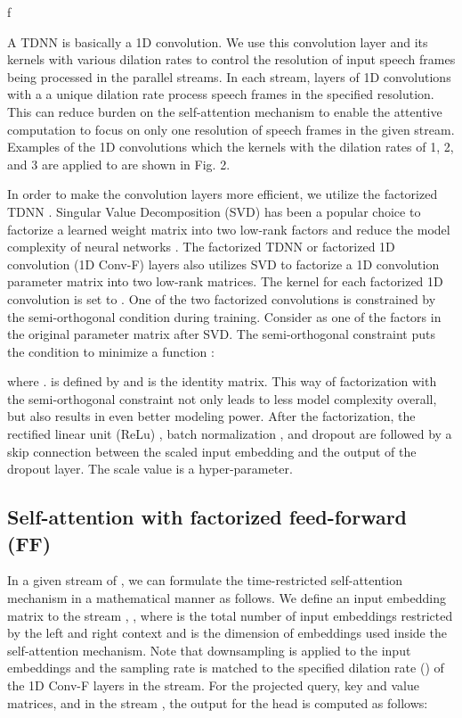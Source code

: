 f\documentclass{article}
\begin{document}
A TDNN is basically a 1D convolution. We use this convolution layer and its kernels with various dilation rates to control the resolution of input speech frames being processed in the parallel streams. In each stream, layers of 1D convolutions with a a unique dilation rate process speech frames in the specified resolution. This can reduce burden on the self-attention mechanism to enable the attentive computation to focus on only one resolution of speech frames in the given stream. Examples of the 1D convolutions which the  kernels with the dilation rates of 1, 2, and 3 are applied to are shown in Fig. 2.

In order to make the convolution layers more efficient, we utilize the factorized TDNN \cite{povey18tdnnf}. Singular Value Decomposition (SVD) has been a popular choice to factorize a learned weight matrix into two low-rank factors and reduce the model complexity of neural networks \cite{xue13,rohit16,Tucker+2016}. The factorized TDNN or factorized 1D convolution  (1D Conv-F) layers also utilizes SVD to factorize a 1D convolution parameter matrix into two low-rank matrices. The kernel for each factorized 1D convolution is set to . One of the two factorized convolutions is constrained by the semi-orthogonal condition during training. Consider  as one of the factors in the original parameter matrix  after SVD. The semi-orthogonal constraint puts the condition to minimize a function :  

where .  is defined by  and  is the identity matrix. This way of factorization with the semi-orthogonal constraint not only leads to less model complexity overall, but also results in even better modeling power. After the factorization, the rectified linear unit (ReLu) \cite{relu}, batch normalization \cite{bn}, and dropout \cite{dropout} are followed by a skip connection \cite{He16} between the scaled input embedding and the output of the dropout layer. The scale value is a hyper-parameter.  




\subsection{Self-attention with factorized feed-forward (FF)}
In a given stream of , we can formulate the time-restricted self-attention mechanism \cite{povey18} in a mathematical manner as follows. We define an input embedding matrix to the stream , , where  is the total number of input embeddings restricted by the left and right context and  is the dimension of embeddings used inside the self-attention mechanism. Note that downsampling is applied to the input embeddings and the sampling rate is matched to the specified dilation rate () of the 1D Conv-F layers in the stream. For the projected query, key and value matrices,  and  in the stream , the output for the  head is computed as follows:
\end{document}
